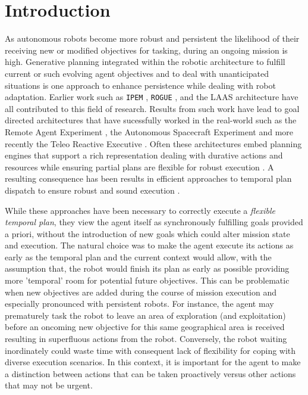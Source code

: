 \section{Introduction}
\label{sec:intro}

As autonomous robots become more robust and persistent the likelihood
of their receiving new or modified objectives for tasking, during an
ongoing mission is high. Generative planning integrated within the
robotic architecture to fulfill current or such evolving agent
objectives and to deal with unanticipated situations is one approach
to enhance persistence while dealing with robot adaptation.  Earlier
work such as \texttt{IPEM} \cite{AmbrosIngerson88}, \texttt{ROGUE}
\cite{Haigh98}, and the LAAS architecture \cite{alami:1998p820} have
all contributed to this field of research. Results from such work have
lead to goal directed architectures that have sucessfully worked in
the real-world such as the Remote Agent Experiment \cite{mus98}, the
Autonomous Spacecraft Experiment \cite{chien99} and more recently the
Teleo Reactive Executive \cite{py10}. Often these architectures embed
planning engines that support a rich representation dealing with
durative actions and resources while ensuring partial plans are
flexible for robust execution \cite{lemai04}.  A resulting consequence
has been results in efficient approaches to temporal plan dispatch to
ensure robust and sound execution \cite{mus98a,morris01}. 

While these approaches have been necessary to correctly execute a
\emph{flexible temporal plan}, they view the agent itself as
synchronously fulfilling goals provided a priori, without the
introduction of new goals which could alter mission state and
execution.
The natural choice was to make the agent execute its actions as early
as the temporal plan and the current context would allow, with the
assumption that, the robot would finish its plan as early as possible
providing more 'temporal' room for potential future objectives.  This
can be problematic when new objectives are added during the course of
mission execution and especially pronounced with persistent
robots. For instance, the agent may prematurely task the robot to
leave an area of exploration (and exploitation) before an oncoming new
objective for this same geographical area is received resulting in
superfluous actions from the robot. Conversely, the robot waiting
inordinately could waste time with consequent lack of flexibility for
coping with diverse execution scenarios. In this context, it is
important for the agent to make a distinction between actions that can
be taken proactively versus other actions that may not be urgent.

